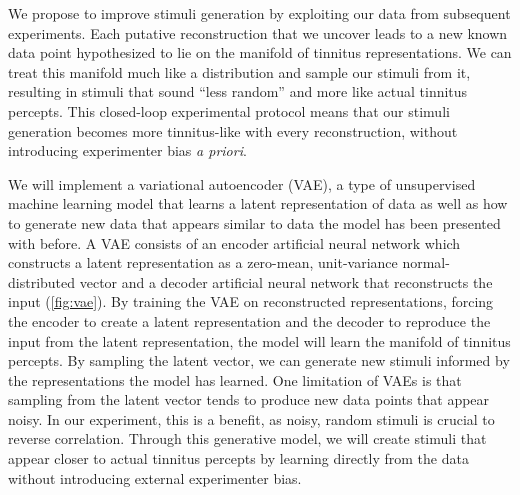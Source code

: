 \documentclass[11pt, notitlepage]{article} %
\begin{document}
We propose to improve stimuli generation by exploiting our data from subsequent experiments.
Each putative reconstruction that we uncover leads to a new known data point hypothesized to lie on the manifold
of tinnitus representations.
We can treat this manifold much like a distribution and sample our stimuli from it,
resulting in stimuli that sound ``less random'' and more like actual tinnitus percepts.
This closed-loop experimental protocol means that our stimuli generation becomes more tinnitus-like
with every reconstruction, without introducing experimenter bias \emph{a priori}.

We will implement a variational autoencoder (VAE), a type of unsupervised machine learning model
that learns a latent representation of data as well as how to generate new data
that appears similar to data the model has been presented with before.
A VAE consists of an encoder artificial neural network
which constructs a latent representation
as a zero-mean, unit-variance normal-distributed vector
and a decoder artificial neural network
that reconstructs the input (\autoref{fig:vae}).
By training the VAE on reconstructed representations,
forcing the encoder to create a latent representation
and the decoder to reproduce the input from the latent representation,
the model will learn the manifold of tinnitus percepts.
By sampling the latent vector,
we can generate new stimuli informed by the representations the model has learned.
One limitation of VAEs is that sampling from the latent vector
tends to produce new data points that appear noisy.
In our experiment, this is a benefit,
as noisy, random stimuli is crucial to reverse correlation.
Through this generative model,
we will create stimuli that appear closer to actual tinnitus percepts
by learning directly from the data
without introducing external experimenter bias.
\end{document}
